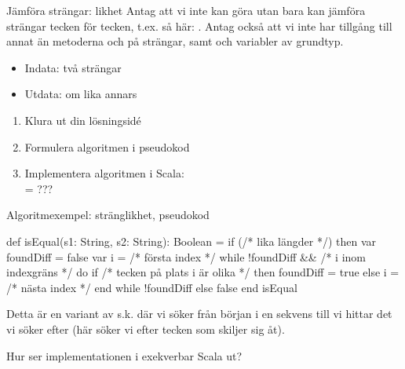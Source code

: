 \begin{Slide}{Jämföra strängar: likhet}\SlideFontSmall
Antag att vi inte kan göra  utan bara kan jämföra strängar tecken för tecken,
t.ex. så här: . Antag också att vi inte har tillgång till annat än metoderna  och  på strängar, samt   och variabler av grundtyp. 

\pause
\begin{itemize}
\item Indata: två strängar
\item Utdata:  om lika annars 
\end{itemize}
\begin{enumerate}
\item Klura ut din lösningsidé
\item Formulera algoritmen i pseudokod
\item Implementera algoritmen i Scala: \\ = ???
\end{enumerate}
\end{Slide}

\begin{Slide}{Algoritmexempel: stränglikhet, pseudokod}
\begin{Code}
def isEqual(s1: String, s2: String): Boolean = 
  if (/* lika längder */) then
    var foundDiff = false
    var i = /* första index */
    while !foundDiff && /* i inom indexgräns */ do
      if /* tecken på plats i är olika */ then foundDiff = true
      else i = /* nästa index */
    end while
    !foundDiff
  else false
end isEqual
\end{Code}

\pause\noindent Detta är en variant av s.k.  där vi söker från början i en sekvens till vi hittar det vi söker efter (här söker vi efter tecken som skiljer sig åt).
\\\pause\vspace{1em}

\noindent Hur ser implementationen i exekverbar Scala ut?
\end{Slide}

